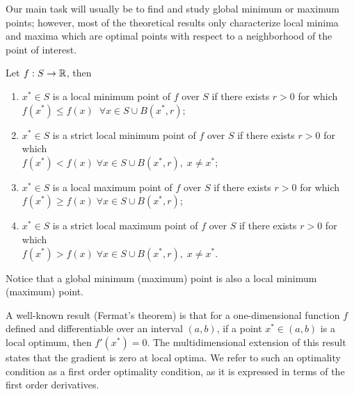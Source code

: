 \documentclass[10pt,a4paper]{article}
\begin{document}
Our main task will usually be to find and study global minimum or maximum points; however, most of the theoretical results only characterize local minima and maxima which are optimal points with respect to a neighborhood of the point of interest. 
\begin{definition} 
	Let $f:S\to \mathbb{R}$, then
	\begin{enumerate}
		\item $x^* \in S$ is a local minimum point of $f$ over $S$ if there exists $r>0$ for which \\$f(x^*)\leq f(x) \;\;\forall x \in S\cup B(x^*,r)$;
		\item $x^* \in S$ is a strict local minimum point of $f$ over $S$ if there exists $r>0$ for which \\$f(x^*)< f(x) \;\forall x \in S\cup B(x^*,r),\; x\neq x^*$;
		\item $x^* \in S$ is a local maximum point of $f$ over $S$ if there exists $r>0$ for which \\ $f(x^*)\geq f(x) \;\forall x \in S\cup B(x^*,r)$;
		\item $x^* \in S$ is a strict local maximum point of $f$ over $S$ if there exists $r>0$ for which \\ $f(x^*)> f(x) \;\forall x \in S\cup B(x^*,r),\; x\neq x^*$.
	\end{enumerate}
\end{definition}
Notice that a global minimum (maximum) point is also a local minimum (maximum) point.
\par A well-known result (Fermat's theorem) is that for a one-dimensional function $f$ defined and differentiable
over an interval $(a, b)$, if a point $x^*\in (a, b)$ is a local optimum, then $f'(x^*) = 0$. The multidimensional extension of this result states that the gradient is zero at local optima. We refer to such an optimality condition as a first order optimality condition, as it is expressed in terms of the first order derivatives.
\end{document}
